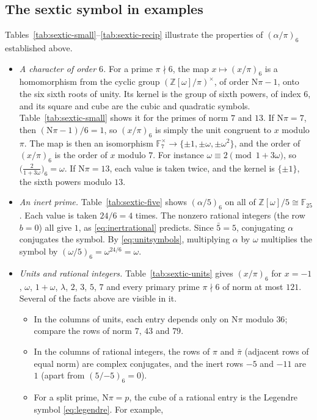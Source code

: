 \documentclass[11pt]{article}
\numberwithin{equation}{section}
\newcommand{\N}{\mathrm N}
\newcommand{\OO}{\mathbb Z[\omega]}
\newcommand{\F}{\mathbb F}
\theoremstyle{definition}
\theoremstyle{remark}
\begin{document}
\subsection{The sextic symbol in examples}\label{sec:sexticexamples}
Tables~\ref{tab:sextic-small}--\ref{tab:sextic-recip} illustrate the properties of $(\alpha/\pi)_6$
established above.
\begin{itemize}
\item \emph{A character of order $6$.} For a prime $\pi\nmid6$, the map $x\mapsto(x/\pi)_6$ is a
homomorphism from the cyclic group $(\OO/\pi)^\times$, of order $\N\pi-1$, onto the six sixth roots of
unity. Its kernel is the group of sixth powers, of index $6$, and its square and cube are the cubic
and quadratic symbols. Table~\ref{tab:sextic-small} shows it for the primes of norm $7$ and $13$. If
$\N\pi=7$, then $(\N\pi-1)/6=1$, so $(x/\pi)_6$ is simply the unit congruent to $x$ modulo $\pi$. The
map is then an isomorphism $\F_7^\times\to\{\pm1,\pm\omega,\pm\omega^2\}$, and the order of $(x/\pi)_6$ is the
order of $x$ modulo $7$. For instance $\omega\equiv2\pmod{1+3\omega}$, so $\bigl(\frac2{1+3\omega}\bigr)_6=\omega$. If
$\N\pi=13$, each value is taken twice, and the kernel is $\{\pm1\}$, the sixth powers modulo $13$.
\item \emph{An inert prime.} Table~\ref{tab:sextic-five} shows $(\alpha/5)_6$ on all of
$\OO/5\cong\F_{25}$. Each value is taken $24/6=4$ times. The nonzero rational integers (the row $b=0$)
all give $1$, as \eqref{eq:inertrational} predicts. Since $\bar5=5$, conjugating $\alpha$ conjugates the
symbol. By \eqref{eq:unitsymbols}, multiplying $\alpha$ by $\omega$ multiplies the symbol by
$(\omega/5)_6=\omega^{24/6}=\omega$.
\item \emph{Units and rational integers.} Table~\ref{tab:sextic-units} gives $(x/\pi)_6$ for $x=-1$,
$\omega$, $1+\omega$, $\lambda$, $2$, $3$, $5$, $7$ and every primary prime $\pi\nmid6$ of norm at most
$121$. Several of the facts above are visible in it.
\begin{itemize}
\item In the columns of units, each entry depends only on $\N\pi$ modulo $36$; compare the rows of norm $7$, $43$
and $79$.
\item In the columns of rational integers, the rows of $\pi$ and $\bar\pi$ (adjacent rows of equal norm) are
complex conjugates, and the inert rows $-5$ and $-11$ are $1$ (apart from $(5/{-5})_6=0$).
\item For a split prime, $\N\pi=p$, the cube of a rational entry is the Legendre symbol \eqref{eq:legendre}. For example,

\end{itemize}
\end{itemize}
\end{document}
